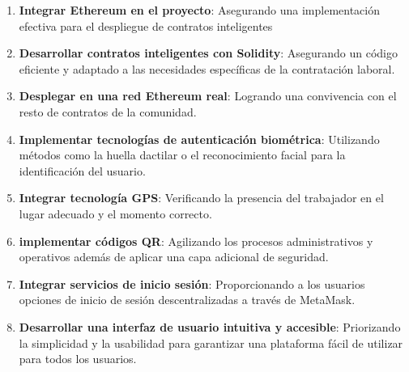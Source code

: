 \begin{enumerate}

\item \textbf{Integrar Ethereum en el proyecto}: Asegurando una implementación efectiva para el despliegue de contratos inteligentes

\item \textbf{Desarrollar contratos inteligentes con Solidity}: Asegurando un código eficiente y adaptado a las necesidades específicas de la contratación laboral. 

\item \textbf{Desplegar en una red Ethereum real}: Logrando una convivencia con el resto de contratos de la comunidad.

\item \textbf{Implementar tecnologías de autenticación biométrica}: Utilizando métodos como la huella dactilar o el reconocimiento facial para la identificación del usuario.

\item \textbf{Integrar tecnología GPS}: Verificando la presencia del trabajador en el lugar adecuado y el momento correcto.

\item \textbf{implementar códigos QR}: Agilizando los procesos administrativos y operativos además de aplicar una capa adicional de seguridad.

\item \textbf{Integrar servicios de inicio sesión}: Proporcionando a los usuarios opciones de inicio de sesión descentralizadas a través de MetaMask.

\item \textbf{Desarrollar una interfaz de usuario intuitiva y accesible}: Priorizando la simplicidad y la usabilidad para garantizar una plataforma fácil de utilizar para todos los usuarios.



\end{enumerate}
